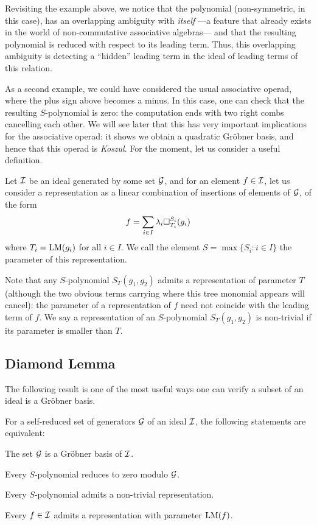 Revisiting the example above, we notice that the
polynomial (non-symmetric, in this case), has an overlapping
ambiguity with \emph{itself} ---a feature that already exists
in the world of non-commutative associative algebras--- and
that the resulting polynomial is reduced with respect to
its leading term. Thus, this overlapping ambiguity is
detecting a ``hidden'' leading term in the ideal of
leading terms of this relation. 

As a second example, we could have considered the usual
associative operad, where the plus sign above becomes a
minus. In this case, one can check that the resulting 
$S$-polynomial is zero: the computation ends with two
right combs cancelling each other. We will see later
that this has very important implications for the associative
operad: it shows we obtain a quadratic Gr\"obner basis,
and hence that this operad is \emph{Koszul}.
For the moment, let us consider a useful
definition.

\begin{definition} Let $\mathcal{I}$ be an ideal generated by some
set $\mathcal G$, and for an element $f\in \mathcal{I}$, let us consider
a representation as a linear combination of insertions of
elements of $\mathcal G$, of the form
\[
f = \sum_{i\in I} \lambda_i \square_{T_i}^{S_i}(g_i)
\]
where $T_i = \operatorname{LM}(g_i)$ for all $i\in I$. We call the element
$S = \max \{ S_i : i \in I\}$ the parameter of this representation.
\end{definition}

Note that any $S$-polynomial $S_T(g_1,g_2)$ admits a representation
of parameter $T$ (although the two obvious terms carrying
where this tree monomial appears will cancel): the parameter
of a representation of $f$ need not coincide with the
leading term of $f$. We say a representation of an
$S$-polynomial $S_T(g_1,g_2)$ is non-trivial if its parameter
is smaller than $T$.

\subsection{Diamond Lemma}
The following result is one of the most useful ways one can
verify a subset of an ideal is a Gr\"obner basis.

\begin{theorem}
For a self-reduced set of generators $\mathcal G$ of an ideal $\mathcal{I}$,
the following statements are equivalent:
\begin{tenumerate}
\item The set $\mathcal G$ is a Gr\"obner basis of $\mathcal{I}$.
\item Every $S$-polynomial reduces to zero modulo $\mathcal G$.
\item Every $S$-polynomial admits a non-trivial representation.
\item Every $f\in \mathcal{I}$ admits a representation with
parameter $\operatorname{LM}(f)$.
\end{tenumerate}
\end{theorem}

